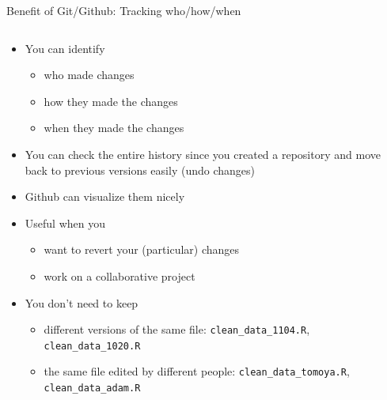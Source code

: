 \documentclass[handout,pdftex,10pt,aspectratio=169]{beamer}
\begin{document}
\begin{frame}{Benefit of Git/Github: Tracking who/how/when}
  \setlength{\leftmarginii}{10pt}
  \begin{columns}%
    \begin{column}{0.46\linewidth}
    \begin{itemize}
      \item<1-> You can identify %
      \begin{itemize}
        \item<1-> who made changes 
        \item<2-> how they made the changes
        \item<3-> when they made the changes
      \end{itemize}
      \item<4-> You can check the entire history since you created a repository
      and move back to previous versions easily (undo changes)
      \item<5-> Github can visualize them nicely
      \medskip
      \item<7-> Useful when you 
      \begin{itemize}
        \item<7-> want to revert your (particular) changes
        \item<8-> work on a collaborative project
      \end{itemize}
      \medskip
      \item<9-> You don't need to keep 
      \begin{itemize}
        \item<9-> different versions of the same file: \texttt{clean\_data\_1104.R}, \texttt{clean\_data\_1020.R}
        \item<10-> the same file edited by different people: \texttt{clean\_data\_tomoya.R}, \texttt{clean\_data\_adam.R}
      \end{itemize}
    \end{itemize}      
  \end{column}\hfill
  \begin{column}{0.53\linewidth}
    \centering

\end{column}
\end{columns}
\end{frame}
\end{document}
